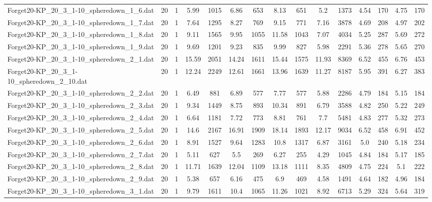 \begin{table}[!ht]
{\begin{tabular}{lcccccccccccccc}
Forget20-KP\_20\_3\_1-10\_spheredown\_1\_6.dat & 20 & 1 & 5.99 & 1015 & 6.86 & 653 & 8.13 & 651 & 5.2 & 1373 & 4.54 & 170 & 4.75 & 170 \\
Forget20-KP\_20\_3\_1-10\_spheredown\_1\_7.dat & 20 & 1 & 7.64 & 1295 & 8.27 & 769 & 9.15 & 771 & 7.16 & 3878 & 4.69 & 208 & 4.97 & 202 \\
Forget20-KP\_20\_3\_1-10\_spheredown\_1\_8.dat & 20 & 1 & 9.11 & 1565 & 9.95 & 1055 & 11.58 & 1043 & 7.07 & 4034 & 5.25 & 287 & 5.69 & 272 \\
Forget20-KP\_20\_3\_1-10\_spheredown\_1\_9.dat & 20 & 1 & 9.69 & 1201 & 9.23 & 835 & 9.99 & 827 & 5.98 & 2291 & 5.36 & 278 & 5.65 & 270 \\
Forget20-KP\_20\_3\_1-10\_spheredown\_2\_1.dat & 20 & 1 & 15.59 & 2051 & 14.24 & 1611 & 15.44 & 1575 & 11.93 & 8369 & 6.52 & 455 & 6.76 & 453 \\
Forget20-KP\_20\_3\_1-10\_spheredown\_2\_10.dat & 20 & 1 & 12.24 & 2249 & 12.61 & 1661 & 13.96 & 1639 & 11.27 & 8187 & 5.95 & 391 & 6.27 & 383 \\
Forget20-KP\_20\_3\_1-10\_spheredown\_2\_2.dat & 20 & 1 & 6.49 & 881 & 6.89 & 577 & 7.77 & 577 & 5.88 & 2286 & 4.79 & 184 & 5.15 & 184 \\
Forget20-KP\_20\_3\_1-10\_spheredown\_2\_3.dat & 20 & 1 & 9.34 & 1449 & 8.75 & 893 & 10.34 & 891 & 6.79 & 3588 & 4.82 & 250 & 5.22 & 249 \\
Forget20-KP\_20\_3\_1-10\_spheredown\_2\_4.dat & 20 & 1 & 6.64 & 1181 & 7.72 & 773 & 8.81 & 761 & 7.7 & 5481 & 4.83 & 277 & 5.32 & 273 \\
Forget20-KP\_20\_3\_1-10\_spheredown\_2\_5.dat & 20 & 1 & 14.6 & 2167 & 16.91 & 1909 & 18.14 & 1893 & 12.17 & 9034 & 6.52 & 458 & 6.91 & 452 \\
Forget20-KP\_20\_3\_1-10\_spheredown\_2\_6.dat & 20 & 1 & 8.91 & 1527 & 9.64 & 1283 & 10.8 & 1317 & 6.87 & 3161 & 5.0 & 240 & 5.18 & 234 \\
Forget20-KP\_20\_3\_1-10\_spheredown\_2\_7.dat & 20 & 1 & 5.11 & 627 & 5.5 & 269 & 6.27 & 255 & 4.29 & 1045 & 4.84 & 184 & 5.17 & 185 \\
Forget20-KP\_20\_3\_1-10\_spheredown\_2\_8.dat & 20 & 1 & 11.71 & 1639 & 12.04 & 1109 & 13.18 & 1111 & 8.35 & 4809 & 4.75 & 224 & 5.1 & 222 \\
Forget20-KP\_20\_3\_1-10\_spheredown\_2\_9.dat & 20 & 1 & 5.38 & 657 & 6.16 & 475 & 6.9 & 469 & 4.58 & 1491 & 4.64 & 182 & 4.96 & 184 \\
Forget20-KP\_20\_3\_1-10\_spheredown\_3\_1.dat & 20 & 1 & 9.79 & 1611 & 10.4 & 1065 & 11.26 & 1021 & 8.92 & 6713 & 5.29 & 324 & 5.64 & 319 \\

\end{tabular}}
\end{table}
